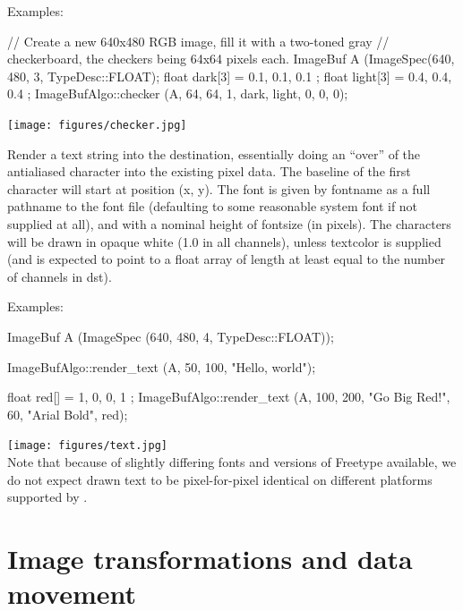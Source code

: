 \smallskip
\noindent Examples:
\begin{code}
    // Create a new 640x480 RGB image, fill it with a two-toned gray
    // checkerboard, the checkers being 64x64 pixels each.
    ImageBuf A (ImageSpec(640, 480, 3, TypeDesc::FLOAT);
    float dark[3] = { 0.1, 0.1, 0.1 };
    float light[3] = { 0.4, 0.4, 0.4 };
    ImageBufAlgo::checker (A, 64, 64, 1, dark, light, 0, 0, 0);
\end{code}
\spc \texttt{[image: figures/checker.jpg]}  \\
\apiend


 
Render a text string into the destination, essentially doing an ``over'' of
the antialiased character into the existing pixel data.  The baseline of the
first character will start at position ({\cf x, y}).  The font is given by
{\cf fontname} as a full pathname to the font file (defaulting to some
reasonable system font if not supplied at all), and with a nominal
height of {\cf fontsize} (in pixels).  The characters will be drawn in
opaque white (1.0 in all channels), unless {\cf textcolor} is
supplied (and is expected to point to a {\cf float} array of length at
least equal to the number of channels in {\cf dst}).

\smallskip
\noindent Examples:
\begin{code}
    ImageBuf A (ImageSpec (640, 480, 4, TypeDesc::FLOAT));

    ImageBufAlgo::render_text (A, 50, 100, "Hello, world");

    float red[] = { 1, 0, 0, 1 };
    ImageBufAlgo::render_text (A, 100, 200, "Go Big Red!",
                               60, "Arial Bold", red);
\end{code}
\spc \texttt{[image: figures/text.jpg]}  \\

\noindent Note that because of slightly differing fonts and versions of
Freetype available, we do not expect drawn text to be pixel-for-pixel 
identical on different platforms supported by \product.
\apiend





\section{Image transformations and data movement}
\label{sec:iba:transforms}

